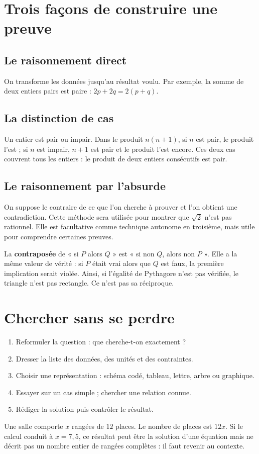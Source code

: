 \documentclass[../cours_3e.tex]{subfiles}
\begin{document}
\section{Trois façons de construire une preuve}
\subsection{Le raisonnement direct}
On transforme les données jusqu'au résultat voulu. Par exemple, la somme de deux entiers pairs est paire : $2p+2q=2(p+q)$.
\subsection{La distinction de cas}
Un entier est pair ou impair. Dans le produit $n(n+1)$, si $n$ est pair, le produit l'est ; si $n$ est impair, $n+1$ est pair et le produit l'est encore. Ces deux cas couvrent tous les entiers : le produit de deux entiers consécutifs est pair.
\subsection{Le raisonnement par l'absurde}
On suppose le contraire de ce que l'on cherche à prouver et l'on obtient une contradiction. Cette méthode sera utilisée pour montrer que $\sqrt2$ n'est pas rationnel. Elle est facultative comme technique autonome en troisième, mais utile pour comprendre certaines preuves.

\approfondissement La \textbf{contraposée} de « si $P$ alors $Q$ » est « si non $Q$, alors non $P$ ». Elle a la même valeur de vérité : si $P$ était vrai alors que $Q$ est faux, la première implication serait violée. Ainsi, si l'égalité de Pythagore n'est pas vérifiée, le triangle n'est pas rectangle. Ce n'est pas sa réciproque.

\section{Chercher sans se perdre}
\begin{methode}
\begin{enumerate}
\item Reformuler la question : que cherche-t-on exactement ?
\item Dresser la liste des données, des unités et des contraintes.
\item Choisir une représentation : schéma codé, tableau, lettre, arbre ou graphique.
\item Essayer sur un cas simple ; chercher une relation connue.
\item Rédiger la solution puis contrôler le résultat.
\end{enumerate}
\end{methode}
\begin{exemple}
Une salle comporte $x$ rangées de $12$ places. Le nombre de places est $12x$. Si le calcul conduit à $x=7{,}5$, ce résultat peut être la solution d'une équation mais ne décrit pas un nombre entier de rangées complètes : il faut revenir au contexte.
\end{exemple}
\end{document}
